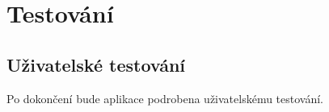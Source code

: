 
\chapter{Testování}

\section{Uživatelské testování}
Po dokončení bude aplikace podrobena uživatelskému testování.
